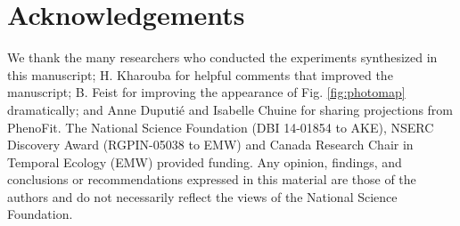 \documentclass{article}
\begin{document}
\section*{Acknowledgements}
We thank the many researchers who conducted the experiments synthesized in this manuscript; H. Kharouba for helpful comments that improved the manuscript; B. Feist for improving the appearance of Fig. \ref{fig:photomap} dramatically; and Anne Duputi\'e and Isabelle Chuine for sharing projections from PhenoFit. The National Science Foundation (DBI 14-01854 to AKE), NSERC Discovery Award (RGPIN-05038 to EMW) and Canada Research Chair in Temporal Ecology (EMW) provided funding. Any opinion, findings, and conclusions or recommendations expressed in this material are those of the authors and do not necessarily reflect the views of the National Science Foundation.

\clearpage







\end{document}
